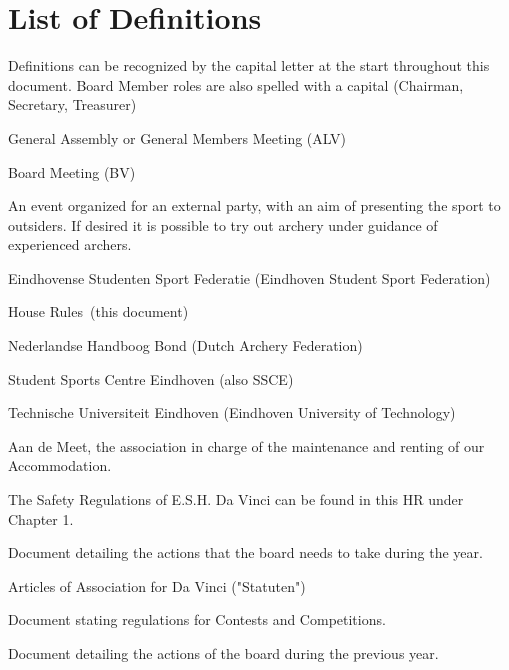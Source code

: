 \documentclass[a4paper]{article}
\newcommand{\Abr}{Administrative Regulations} %
\newcommand{\Asta}{Bylaws} %
\newcommand{\Ahr}{House Rules} %
\newcommand{\Asr}{Safety Rules} %
\newcommand{\Awr}{Contest Rules} %
\newcommand{\Ajv}{Annual Report} %
\begin{document}
\newpage

\tableofcontents
\pagebreak
\section*{List of Definitions}
{\g Definitions can be recognized by the capital letter at the start throughout this document. Board Member roles are also spelled with a capital (Chairman, Secretary, Treasurer)}

\bigskip

\begin{description}[font=\sffamily\bfseries, leftmargin=1cm, style=nextline]
  \item[GA]
    General Assembly or General Members Meeting (ALV)
  \item[BM]
    Board Meeting (BV)
  \item[Workshop]
    An event organized for an external party, with an aim of presenting the sport to outsiders. If desired it is possible to try out archery under guidance of experienced archers.
    \item[ESSF]
    Eindhovense Studenten Sport Federatie (Eindhoven Student Sport Federation)
    \item[HR]
    \Ahr\ (this document)
    \item[NHB]
    Nederlandse Handboog Bond (Dutch Archery Federation)
    \item[SSC]
    Student Sports Centre Eindhoven (also SSCE)
    \item[TU/e]
    Technische Universiteit Eindhoven (Eindhoven University of Technology)
    \item[ADM]
    Aan de Meet, the association in charge of the maintenance and renting of our Accommodation.
    \item[\Asr]
    The Safety Regulations of E.S.H. Da Vinci can be found in this HR under Chapter 1.
\item[\Abr] Document detailing the actions that the board needs to take during the year.
\item[\Asta] Articles of Association for Da Vinci ("Statuten")
\item[\Awr] Document stating regulations for Contests and Competitions.
\item[\Ajv] Document detailing the actions of the board during the previous year.
    

\end{description}
\end{document}
